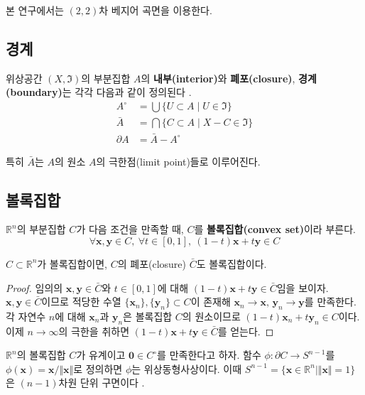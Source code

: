 \documentclass{Humantech_Paper_Awardfullpaper_hutech}
\begin{document}
본 연구에서는 $(2, 2)$차 베지어 곡면을 이용한다. 

\subsection{경계}
\begin{defn}
	위상공간 $(X, \mathfrak{I})$의 부분집합 $A$의 \textbf{내부(interior)}와 \textbf{폐포(closure)}, \textbf{경계(boundary)}는 각각 다음과 같이 정의된다 \cite{Munkres}.
	\begin{align*}
		A^\circ &= \bigcup \{ U \subset A \mid U \in \mathfrak{I} \} \\
		\bar{A} &= \bigcap \{ C \subset A \mid X-C \in \mathfrak{I} \} \\
		\partial A &= \bar{A} - A^\circ
	\end{align*}
\end{defn}

특히 $\bar{A}$는 $A$의 원소 $A$의 극한점(limit point)들로 이루어진다. 

\subsection{볼록집합}
\begin{defn}
	$\mathbb{R}^n$의 부분집합 $C$가 다음 조건을 만족할 때, $C$를 \textbf{볼록집합(convex set)}이라 부른다. 
	\begin{equation*}
		\forall \mathbf{x}, \mathbf{y} \in C,\ \forall t \in [0, 1],\ (1-t)\mathbf{x}+t\mathbf{y} \in C
	\end{equation*}
\end{defn}

\begin{lem} \label{closureofconvexset}
	$C \subset \mathbb{R}^n$가 볼록집합이면, $C$의 폐포(closure) $\bar{C}$도 볼록집합이다. 
\end{lem}
\begin{proof}
	임의의 $\mathbf{x}, \mathbf{y} \in \bar{C}$와 $t \in [0, 1]$에 대해 $(1-t)\mathbf{x} + t\mathbf{y} \in \bar{C}$임을 보이자. $\mathbf{x}, \mathbf{y} \in \bar{C}$이므로 적당한 수열 $\{ \mathbf{x}_n \}, \{ \mathbf{y}_n \} \subset C$이 존재해 $\mathbf{x}_n \to \mathbf{x}, \, \mathbf{y}_n \to \mathbf{y}$를 만족한다. 각 자연수 $n$에 대해 $\mathbf{x}_n$과 $\mathbf{y}_n$은 볼록집합 $C$의 원소이므로 $(1-t)\mathbf{x}_n + t\mathbf{y}_n \in C$이다. 이제 $n \to \infty$의 극한을 취하면 $(1-t)\mathbf{x} + t\mathbf{y} \in \bar{C}$를 얻는다. 
\end{proof}

\begin{thm} \label{homeo}
	$\mathbb{R}^n$의 볼록집합 $C$가 유계이고 $\mathbf{0} \in C^\circ$를 만족한다고 하자. 함수 $\phi \colon \partial C \to S^{n-1}$를 $\phi(\mathbf{x}) = \mathbf{x} / \Vert \mathbf{x} \Vert$로 정의하면 $\phi$는 위상동형사상이다. 이때 $S^{n-1} = \{ \mathbf{x} \in \mathbb{R}^n \mid \Vert \mathbf{x} \Vert = 1 \}$은 $(n-1)$차원 단위 구면이다 \cite{convex}.
\end{thm}
\end{document}

